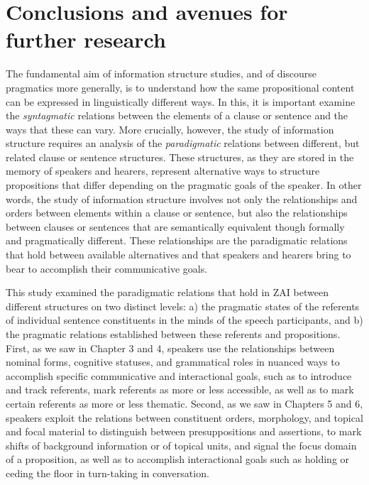 
\chapter{Conclusions and avenues for further research}


The fundamental aim of information structure studies, and of discourse pragmatics more generally, is to understand how the same propositional content can be expressed in linguistically different ways. In this, it is important examine the \textit{syntagmatic} relations between the elements of a clause or sentence and the ways that these can vary. More crucially, however, the study of information structure requires an analysis of the \textit{paradigmatic} relations between different, but related clause or sentence structures. These structures, as they are stored in the memory of speakers and hearers, represent alternative ways to structure propositions that differ depending on the pragmatic goals of the speaker. In other words, the study of information structure involves not only the relationships and orders between elements within a clause or sentence, but also the relationships between clauses or sentences that are semantically equivalent though formally and pragmatically different. These relationships are the paradigmatic relations that hold between available alternatives and that speakers and hearers bring to bear to accomplish their communicative goals. 

This study examined the paradigmatic relations that hold in ZAI between different structures on two distinct levels: a) the pragmatic states of the referents of individual sentence constituents in the minds of the speech participants, and b) the pragmatic relations established between these referents and propositions. First, as we saw in Chapter 3 and 4, speakers use the relationships between nominal forms, cognitive statuses, and grammatical roles in nuanced ways to accomplish specific communicative and interactional goals, such as to introduce and track referents, mark referents as more or less accessible, as well as to mark certain referents as more or less thematic. Second, as we saw in Chapters 5 and 6, speakers exploit the relations between constituent orders, morphology, and topical and focal material to distinguish between presuppositions and assertions, to mark shifts of background information or of topical units, and signal the focus domain of a proposition, as well as to accomplish interactional goals such as holding or ceding the floor in turn-taking in conversation.

